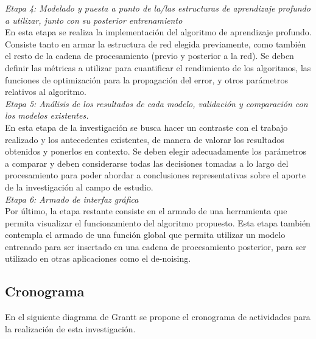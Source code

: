 \textit{Etapa 4: Modelado y puesta a punto de la/las estructuras de aprendizaje profundo a utilizar, junto con su posterior entrenamiento}\\
En esta etapa se realiza la implementación del algoritmo de aprendizaje profundo. Consiste tanto en armar la estructura de red elegida previamente, como también el resto de la cadena de procesamiento (previo y posterior a la red). Se deben definir las métricas a utilizar para cuantificar el rendimiento de los algoritmos, las funciones de  optimización para la propagación del error, y otros parámetros relativos al algoritmo. \\

\textit{Etapa 5: Análisis de los resultados de cada modelo, validación y comparación con los modelos existentes.}\\
En esta etapa de la investigación se busca hacer un contraste con el trabajo realizado y los antecedentes existentes, de manera de valorar los resultados obtenidos y ponerlos en contexto. Se deben elegir adecuadamente los parámetros a comparar y deben considerarse todas las decisiones tomadas a lo largo del procesamiento para poder abordar a conclusiones representativas sobre el aporte de la investigación al campo de estudio. \\

\textit{Etapa 6: Armado de interfaz gráfica}\\
Por último, la etapa restante consiste en el armado de una herramienta que permita visualizar el funcionamiento del algoritmo propuesto. Esta etapa también contempla el armado de una función global que permita utilizar un modelo entrenado para ser insertado en una cadena de procesamiento posterior, para ser utilizado en otras aplicaciones como el de-noising. \\


\subsection{Cronograma}

En el siguiente diagrama de Grantt se propone el cronograma de actividades para la realización de esta investigación. 

